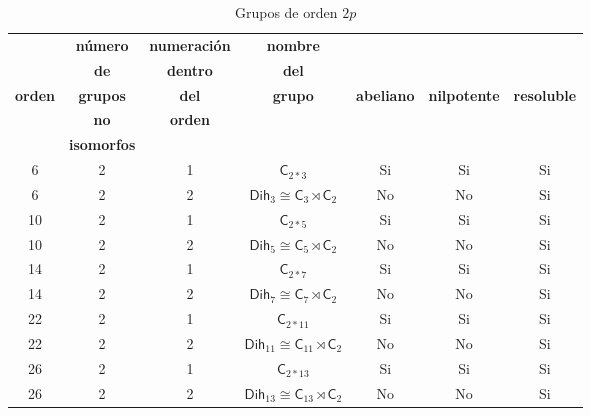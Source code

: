 \documentclass[12pt,a4paper,fleqn,spanish,final,openright]{extbook}
\theoremstyle{definition}
\theoremstyle{remark}
\begin{document}
\begin{table}[h!]
    \begin{center}
        \caption{Grupos de orden $2p$}
        \label{tab:GruposOrden2p}
        \begin{tabular}{c|c|c|c|c|c|c} %
            \textbf{} & \tiny\textbf{número} &\tiny\textbf{numeración} & \tiny\textbf{nombre} & \textbf{} & {} & {} \\
            \textbf{} & \tiny\textbf{de} &\tiny\textbf{dentro} & \tiny\textbf{del} & \tiny\textbf{} & {} & {} \\
            \tiny\textbf{orden} & \tiny\textbf{grupos} & \tiny\textbf{del} & \tiny\textbf{grupo} & \tiny\textbf{abeliano}  & \tiny\textbf{nilpotente} & \tiny\textbf{resoluble} \\
            \textbf{} & \tiny\textbf{no} & \tiny\textbf{orden} & \textbf{} & \textbf{} & {} & {} \\
            \textbf{} & \tiny\textbf{isomorfos} &\textbf{} & \textbf{} & \textbf{} & {} & {} \\
            \hline
            6 & 2 & 1 & ${\textsf{C}}_{2*3}$ & Si & Si & Si \\
            \hline
            6 & 2 & 2  & ${{\textsf{Dih}}_{3}}     \cong     {{\textsf{C}}_{3}}\rtimes{{{\textsf{C}}_{2}}}$ & No & No & Si \\
            \hline
            10 & 2 & 1 & ${\textsf{C}}_{2*5}$ & Si & Si & Si \\
            \hline
            10 & 2 & 2  & ${{\textsf{Dih}}_{5}}     \cong     {{\textsf{C}}_{5}}\rtimes{{{\textsf{C}}_{2}}}$ & No & No & Si \\
            \hline
            14 & 2 & 1 & ${\textsf{C}}_{2*7}$ & Si & Si & Si \\
            \hline
            14 & 2 & 2  & ${{\textsf{Dih}}_{7}}     \cong     {{\textsf{C}}_{7}}\rtimes{{{\textsf{C}}_{2}}}$ & No & No & Si \\
            \hline
            22 & 2 & 1 & ${\textsf{C}}_{2*11}$ & Si & Si & Si \\
            \hline
            22 & 2 & 2  & ${{\textsf{Dih}}_{11}}     \cong     {{\textsf{C}}_{11}}\rtimes{{{\textsf{C}}_{2}}}$ & No & No & Si \\
            \hline
            26 & 2 & 1 & ${\textsf{C}}_{2*13}$ & Si & Si & Si \\
            \hline
            26 & 2 & 2  & ${{\textsf{Dih}}_{13}}     \cong     {{\textsf{C}}_{13}}\rtimes{{{\textsf{C}}_{2}}}$ & No & No & Si \\

\end{tabular}
\end{center}
\end{table}
\end{document}

